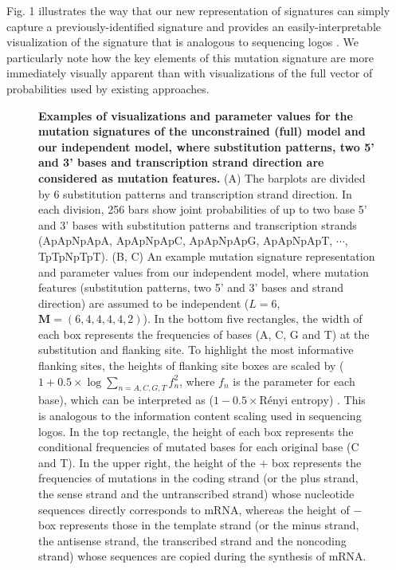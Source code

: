 \documentclass[10pt,letterpaper]{article}
\begin{document}
Fig. 1 illustrates the way that our new representation of signatures can simply capture
a previously-identified signature \cite{pmid25362482, pmid23318258} and provides
an easily-interpretable visualization of the signature 
that is analogous to  sequencing logos \cite{pmid2172928}.
We particularly note how the key elements of this mutation signature are more immediately visually apparent than with visualizations of the full vector of probabilities used by existing approaches.

\begin{figure}[h]

\caption{{\bf Examples of visualizations and parameter values for the mutation signatures of the unconstrained (full) model and our independent model, 
where substitution patterns, two 5' and 3' bases and transcription strand direction are considered as mutation features.}
(A) The barplots are divided by 6 substitution patterns and transcription strand direction.
In each division, 256 bars show joint probabilities of up to two base 5' and 3' bases with substitution patterns and transcription strands
(ApApNpApA, ApApNpApC, ApApNpApG, ApApNpApT, $\cdots$, TpTpNpTpT).
(B, C) An example mutation signature representation and parameter values from our independent model, where mutation features (substitution patterns, two 5' and 3' bases and strand direction) 
are assumed to be independent ($L=6$, $\bm{M} = (6, 4, 4, 4, 4, 2)$).
In the bottom five rectangles, the width of each box represents the frequencies of bases (A, C, G and T) at the substitution and flanking site. 
To highlight the most informative flanking sites, the heights of flanking site boxes are scaled by ($1 + 0.5 \times \log \sum_{n = A,C,G,T} f_n^2$, where $f_n$ is the parameter for each base), which can be interpreted as ($1 - 0.5 \times \text{R\'enyi entropy}$) \cite{rrnyi1961measures}. This is analogous to the information content scaling used in sequencing logos.
In the top rectangle, the height of each box represents the conditional frequencies of mutated bases for each original base (C and T).
In the upper right, the height of the $+$ box represents the frequencies of mutations in the coding strand (or the plus strand, the sense strand and the untranscribed strand)
whose nucleotide sequences directly corresponds to mRNA, 
whereas the height of $-$ box represents those in the template strand (or the minus strand, the antisense strand, the transcribed strand and the noncoding strand)
whose sequences are copied during the synthesis of mRNA.
}
\label{mutSig_example}

\end{figure}
\end{document}
